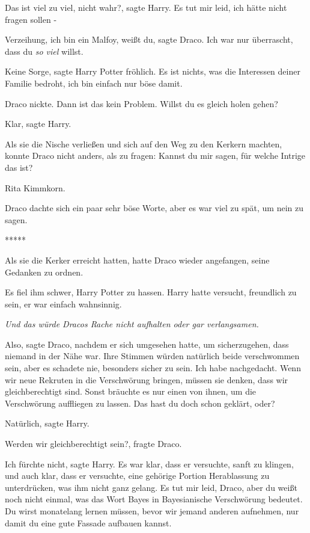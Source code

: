 \glqq{}Das ist viel zu viel, nicht wahr?\grqq{}, sagte Harry. \glqq{}Es tut mir
leid, ich hätte nicht fragen sollen -\grqq{}

\glqq{}Verzeihung, ich bin ein Malfoy, weißt du\grqq{}, sagte Draco. \glqq{}Ich
war nur überrascht, dass du \emph{so viel} willst.\grqq{}

\glqq{}Keine Sorge\grqq{}, sagte Harry Potter fröhlich. \glqq{}Es ist nichts,
was die Interessen deiner Familie bedroht, ich bin einfach nur böse
damit.\grqq{}

Draco nickte. \glqq{}Dann ist das kein Problem. Willst du es gleich holen
gehen?\grqq{}

\glqq{}Klar\grqq{}, sagte Harry.

Als sie die Nische verließen und sich auf den Weg zu den Kerkern machten, konnte
Draco nicht anders, als zu fragen: \glqq{}Kannst du mir sagen, für welche
Intrige das ist?\grqq{}

\glqq{}Rita Kimmkorn.\grqq{}

Draco dachte sich ein paar sehr böse Worte, aber es war viel zu spät, um nein zu
sagen.

\begin{center}*****\end{center}

Als sie die Kerker erreicht hatten, hatte Draco wieder angefangen, seine
Gedanken zu ordnen.

Es fiel ihm schwer, Harry Potter zu hassen. Harry hatte versucht, freundlich zu
sein, er war einfach wahnsinnig.

\emph{Und das würde Dracos Rache nicht aufhalten oder gar verlangsamen.}

\glqq{}Also\grqq{}, sagte Draco, nachdem er sich umgesehen hatte, um
sicherzugehen, dass niemand in der Nähe war. Ihre Stimmen würden natürlich beide
verschwommen sein, aber es schadete nie, besonders sicher zu sein. \glqq{}Ich
habe nachgedacht. Wenn wir neue Rekruten in die Verschwörung bringen, müssen sie
denken, dass wir gleichberechtigt sind. Sonst bräuchte es nur einen von ihnen,
um die Verschwörung auffliegen zu lassen. Das hast du doch schon geklärt,
oder?\grqq{}

\glqq{}Natürlich\grqq{}, sagte Harry.

\glqq{}Werden wir gleichberechtigt sein?\grqq{}, fragte Draco.

\glqq{}Ich fürchte nicht\grqq{}, sagte Harry. Es war klar, dass er versuchte,
sanft zu klingen, und auch klar, dass er versuchte, eine gehörige Portion
Herablassung zu unterdrücken, was ihm nicht ganz gelang. \glqq{}Es tut mir leid,
Draco, aber du weißt noch nicht einmal, was das Wort Bayes in Bayesianische
Verschwörung bedeutet. Du wirst monatelang lernen müssen, bevor wir jemand
anderen aufnehmen, nur damit du eine gute Fassade aufbauen kannst.\grqq{}

